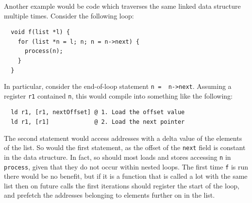 Another example would be code which traverses the same linked data
structure multiple times. Consider the following loop:

\begin{lstlisting}
  void f(list *l) {
    for (list *n = l; n; n = n->next) {
      process(n);
    }
  }
\end{lstlisting}

In particular, consider the end-of-loop statement {\lstinline|n =  n->next|}. 
Assuming a register {\lstinline|r1|} contained {\lstinline|n|}, this
would compile into something like the following:
\begin{lstlisting}
  ld r1, [r1, nextOffset] @ 1. Load the offset value
  ld r1, [r1]             @ 2. Load the next pointer
\end{lstlisting}
The second statement would access addresses with a delta value of the
elements of the list. So would the first statement, as the offset of
the {\lstinline|next|} field is constant in the data structure. In
fact, so should most loads and stores accessing {\lstinline|n|} in
{\lstinline|process|}, given that they do not occur within nested
loops. The first time {\lstinline|f|} is run there would be no
benefit, but if it is a function that is called a lot with the same
list then on future calls the first iterations should register the
start of the loop, and prefetch the addresses belonging to elements
further on in the list.
